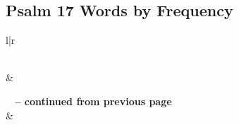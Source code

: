 

\subsection{Psalm 17 Words by Frequency}


\normalsize
 
\begin{center}
\begin{longtable}{l|r}
\caption[Psalm 17 Words by Frequency]{Psalm 17 Words by Frequency}\label{table:WordsbyFrequency for Psalm 17} \\
\hline {} &  \\ \hline 
\endfirsthead
 
{{\bfseries \tablename\ \thetable{} -- continued from previous page}} \\  
\hline {} &  \\ \hline 
\endhead
 

\end{longtable}
\end{center}
